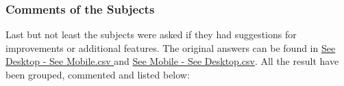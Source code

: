 \begin{table}[htb]
  \caption{Correlation between the Android version or device and the dependent variables calculated with the \gls{tau}}
  \label{table:android-tau}
  \end{table}

\subsubsection{Comments of the Subjects}
Last but not least the subjects were asked if they had suggestions for improvements or additional features.
The original answers can be found in \hyperref[group1]{See Desktop - See Mobile.csv } and \hyperref[group2]{See Mobile - See Desktop.csv}.
All the result have been grouped, commented and listed below: 

